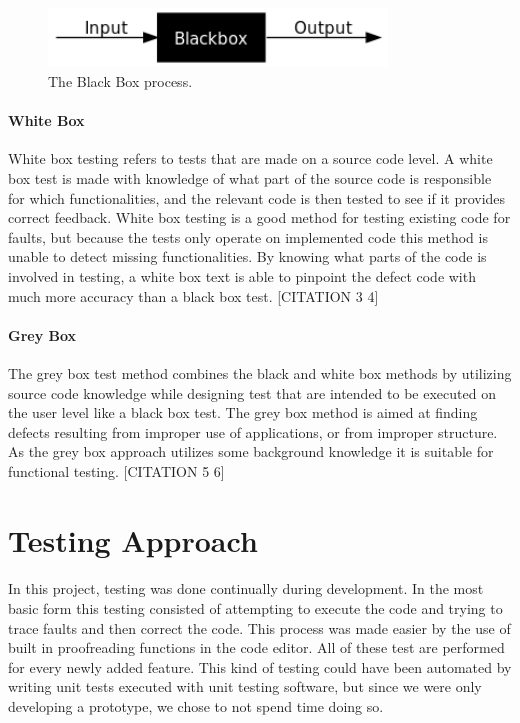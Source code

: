 \begin{figure}[ht!]
\centering
\includegraphics[width=90mm]{./Testing/img/BlackBoxTesting.png}
\caption{The Black Box process. \label{TestBB}}
\end{figure}

\paragraph{White Box} White box testing refers to tests that are made on a source code level. A white box test is made with knowledge of what part of the source code is responsible for which functionalities, and the relevant code is then tested to see if it provides correct feedback. White box testing is a good method for testing existing code for faults, but because the tests only operate on implemented code this method is unable to detect missing functionalities. By knowing what parts of the code is involved in testing, a white box text is able to pinpoint the defect code with much more accuracy than a black box test. [CITATION 3 4]

\paragraph{Grey Box}
The grey box test method combines the black and white box methods by utilizing source code knowledge while designing test that are intended to be executed on the user level like a black box test. The grey box method is aimed at finding defects resulting from improper use of applications, or from improper structure. As the grey box approach utilizes some background knowledge it is suitable for functional testing. [CITATION 5 6]

\section{Testing Approach}
\label{sec:TestingApproach}

\paragraph{} In this project, testing was done continually during development. In the most basic form this testing consisted of attempting to execute the code and trying to trace faults and then correct the code. This process was made easier by the use of built in proofreading functions in the code editor. All of these test are performed for every newly added feature. This kind of testing could have been automated by writing unit tests executed with unit testing software, but since we were only developing a prototype, we chose to not spend time doing so.

